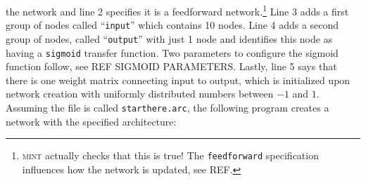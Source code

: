 \documentclass[12pt,letterpaper]{memoir}
\newcommand{\mint}{{\scshape\sffamily mint}\xspace}
\begin{document}
the network and line 2 specifies it is a feedforward
network.\footnote{\mint actually checks that this is true! The
  \lstinline{feedforward} specification influences how the network is
  updated, see REF.} Line 3 adds a first group of nodes called
``\lstinline{input}'' which contains 10 nodes. Line 4 adds a second
group of nodes, called ``\lstinline{output}'' with just 1 node and
identifies this node as having a \lstinline{sigmoid} transfer
function. Two parameters to configure the sigmoid function follow, see
REF SIGMOID PARAMETERS. Lastly, line 5 says that there is one weight
matrix connecting input to output, which is initialized upon network
creation with uniformly distributed numbers between $-1$ and $1$.
Assuming the file is called \lstinline{starthere.arc}, the following
program creates a network with the specified architecture:

 
\end{document}
